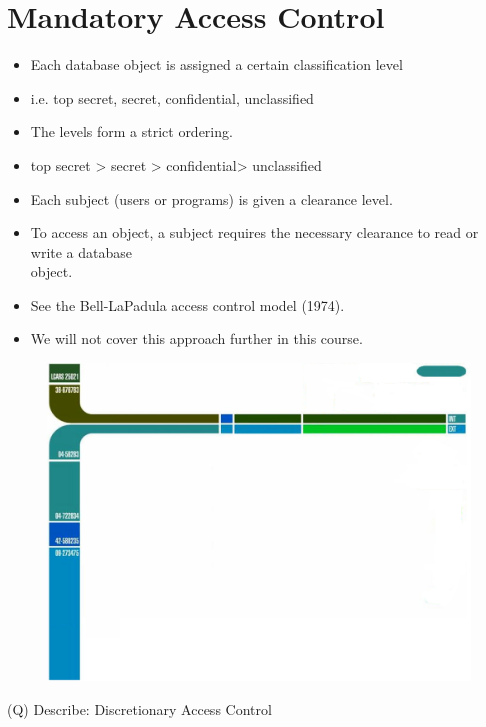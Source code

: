 \documentclass[12pt]{article}
\begin{document}
\section{Mandatory Access Control}
\begin{itemize}
  \item Each database object is assigned a certain 
classification level\\
  \item i.e. top secret, secret, confidential, unclassified
  \item The levels form a strict ordering.
  \item top secret > secret > confidential> unclassified
  \item Each subject (users or programs) is given a 
clearance level.\\
  \item To access an object, a subject requires the 
necessary clearance to read or write a database \\
object.\\
  \item See the Bell-LaPadula access control model (1974).
  \item We will not cover this approach further in this 
course.\\
\end{itemize}
\begin{figure}[H]
\includegraphics[width=0.5\linewidth]{page16-image-1.png}
\end{figure}
\clearpage
(Q)
Describe: Discretionary Access Control
\\ 
 \\
\end{document}
